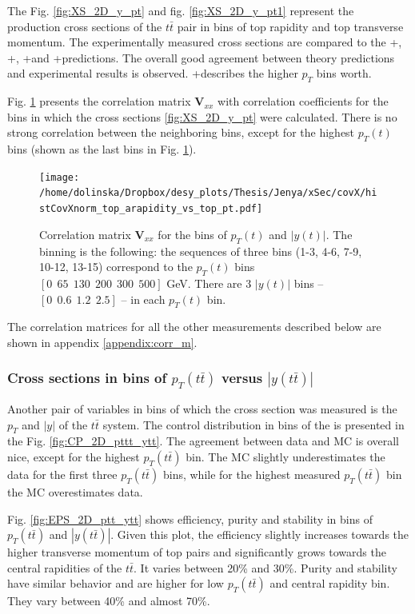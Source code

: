 The Fig. \ref{fig:XS_2D_y_pt} and fig. \ref{fig:XS_2D_y_pt1} represent the production cross sections of the $t\bar{t}$ pair in bins of top rapidity and top transverse momentum.
The experimentally measured cross sections are compared to the \MG+\PYTHIA, \Powheg+\PYTHIA, \Powheg+\HERWIG and \MCNLO+\HERWIG predictions.
The overall good agreement between theory predictions and experimental results is observed. \MG+\PYTHIA describes the higher $p_{T}$ bins
worth.

Fig. \ref{fig:corr_matr} presents the correlation matrix $\mathbf{V}_{xx}$ with correlation coefficients for the bins in which the 
cross sections \ref{fig:XS_2D_y_pt} were calculated. There is no strong correlation between the neighboring bins, except for the highest $p_{T}(t)$
bins (shown as the last bins in Fig. \ref{fig:corr_matr}).

\begin{figure}[t]
  \centering
  \texttt{[image: /home/dolinska/Dropbox/desy\_plots/Thesis/Jenya/xSec/covX/histCovXnorm\_top\_arapidity\_vs\_top\_pt.pdf]}
  \caption{Correlation matrix $\mathbf{V}_{xx}$ for the bins of $p_{T}(t)$ and $|y(t)|$. The binning is the following:
  the sequences of three bins (1-3, 4-6, 7-9, 10-12, 13-15) correspond to the $p_{T}(t)$ bins $[0\:\:65\:\:130\:\:200\:\:300\:\:500]$ GeV.
          There are 3 $|y(t)|$ bins -- $[0\:\:0.6\:\:1.2\:\:2.5]$ -- in each $p_{T}(t)$ bin.}
  \label{fig:corr_matr}
\end{figure}

The correlation matrices for all the other measurements described below are shown in appendix \ref{appendix:corr_m}.

\subsubsection{Cross sections in bins of $p_{T}(t\bar{t})$ versus $|y(t\bar{t})|$}

Another pair of variables in bins of which the cross section was measured is the $p_{T}$ and $|y|$ of the $t\bar{t}$ system. 
The control distribution in bins of the is presented in the Fig. \ref{fig:CP_2D_pttt_ytt}. The agreement between data and MC is overall nice, 
except for the highest $p_{T}(t\bar{t})$ bin. The MC slightly underestimates the data for the first three $p_{T}(t\bar{t})$ bins, while
for the highest measured $p_{T}(t\bar{t})$ bin the MC overestimates data. 

Fig. \ref{fig:EPS_2D_ptt_ytt} shows efficiency, purity and stability in bins of $p_{T}(t\bar{t})$ and $|y(t\bar{t})|$. Given this plot, the efficiency
slightly increases towards the higher transverse momentum of top pairs and significantly grows towards the central rapidities of the $t\bar{t}$. It varies
between 20\% and 30\%. Purity
and stability have similar behavior and are higher for low $p_{T}(t\bar{t})$ and central rapidity bin. They vary between 40\% and almost 70\%.

